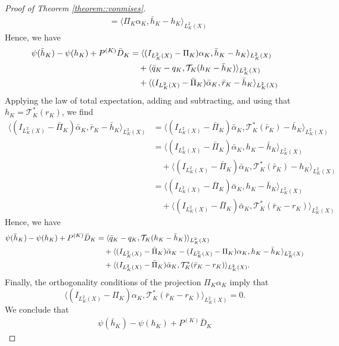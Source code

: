 \documentclass[11pt]{article}
\theoremstyle{plain}
\theoremstyle{definition}
\theoremstyle{remark}
\theoremstyle{definition}
\begin{document}
\begin{proof}[Proof of Theorem \ref{theorem::vonmises}]
\begin{align*}
     &=  \langle \Pi_K \alpha_K, \bar h_K -  h_K \rangle_{L_K^2(X)} 
\end{align*} 
Hence, we have
\begin{align*}
    \psi(\bar{h}_K) - \psi(h_K) + P^{(K)} \bar D_K 
        &=  \langle (I_{L_K^2(X)} - \Pi_K)\alpha_K  ,  \bar h_K -  h_K \rangle_{L_K^2(X)} \notag \\
    & \quad + \langle \bar q_K - q_K, \mathcal{T}_K( h_K - \bar h_K ) \rangle_{L_K^2(X)}\notag \\
    &\quad + \langle (I_{L_K^2(X)} - \bar \Pi_K) \bar \alpha_K, \bar r_K - \bar h_K \rangle_{L_K^2(X)}
\end{align*}
Applying the law of total expectation, adding and subtracting, and using that $h_K  = \mathcal{T}_K^*(r_K)$, we find
\begin{align*}
    \langle (I_{L_K^2(X)} - \bar \Pi_K) \bar \alpha_K, \bar r_K - \bar h_K \rangle_{L_K^2(X)}  &= \langle (I_{L_K^2(X)} - \bar \Pi_K) \bar \alpha_K, \mathcal{T}_K^*(\bar r_K) - \bar h_K \rangle_{L_K^2(X)}\\
 &=   \langle (I_{L_K^2(X)} - \bar \Pi_K) \bar \alpha_K, h_K - \bar h_K \rangle_{L_K^2(X)}\\
     &\quad + \langle (I_{L_K^2(X)} - \bar \Pi_K) \bar \alpha_K, \mathcal{T}_K^*(\bar r_K) - h_K \rangle_{L_K^2(X)}\\
      &=   \langle (I_{L_K^2(X)} - \bar \Pi_K) \bar \alpha_K, h_K - \bar h_K \rangle_{L_K^2(X)}\\
     &\quad + \langle (I_{L_K^2(X)} - \bar \Pi_K) \bar \alpha_K, \mathcal{T}_K^*(\bar r_K - r_K) \rangle_{L_K^2(X)}
\end{align*}
Hence, we have
\begin{align*}
    \psi(\bar{h}_K) - \psi(h_K) + P^{(K)} \bar D_K 
        &=    \langle \bar q_K - q_K, \mathcal{T}_K( h_K - \bar h_K ) \rangle_{L_K^2(X)}\notag \\
    &\quad +   \langle (I_{L_K^2(X)} - \bar \Pi_K) \bar \alpha_K - (I_{L_K^2(X)} - \Pi_K)\alpha_K , h_K - \bar h_K \rangle_{L_K^2(X)}\\
     &\quad + \langle (I_{L_K^2(X)} - \bar \Pi_K) \bar \alpha_K, \mathcal{T}_K^*(\bar r_K - r_K) \rangle_{L_K^2(X)}.
\end{align*}
Finally, the orthogonality conditions of the projection $\Pi_K \alpha_K$ imply that
$$ \langle (I_{L_K^2(X)} - \Pi_K)  \alpha_K, \mathcal{T}_K^*(\bar r_K - r_K) \rangle_{L_K^2(X)} = 0.$$
We conclude that
\begin{align*}
    \psi(\bar{h}_K) - \psi(h_K) + P^{(K)} \bar D_K 

\end{align*}
\end{proof}
\end{document}
